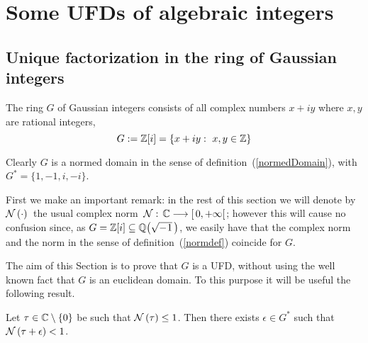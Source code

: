 \chapter{Some UFDs of algebraic integers}\label{UFD}

\section{Unique factorization in the ring of
Gaussian integers}\label{gaussians}

\begin{defn}\label{def1}
The ring $G$ of Gaussian integers consists of
all complex numbers $x+iy$ where $x,y$ are
rational integers, \ie
\begin{equation}\label{gauss}
G:= \mathbb{Z}[i] = \left\{x + iy :\ x,y \in \mathbb{Z} \right\}
\end{equation}
\end{defn}
Clearly $G$ is a normed domain in the sense of
definition~(\ref{normedDomain}), with
$G^\ast =\{1,-1,i,-i\}$.

\bigskip
First we make an important remark: in the rest
of this section we will denote by\, $\mathcal{N}\left(\cdot\right)$
\,the usual complex norm\, $\mathcal{N}:\, \mathbb{C}
\longrightarrow \left[\, 0, +\infty \right[$;
however this will cause no confusion since, as
$G = \Z[i] \subseteq \QQM{1}$, we easily have that the
complex norm and the norm in the sense of
definition~(\ref{normdef}) coincide for $G$.

\bigskip
The aim of this Section is to prove that $G$
is a UFD, without using the well known fact that
$G$ is an euclidean domain. To this purpose it will
be useful the following result.

\begin{lem}\label{lemmaGaussian} Let
$\tau \in \mathbb{C}\setminus\left\{0\right\}$ be such that $\mathcal{N}\left(\tau\right)
\leq 1$. Then there exists $\epsilon \in G^\ast$
such that $\mathcal{N}\left(\tau + \epsilon\right) < 1$.
\end{lem}

